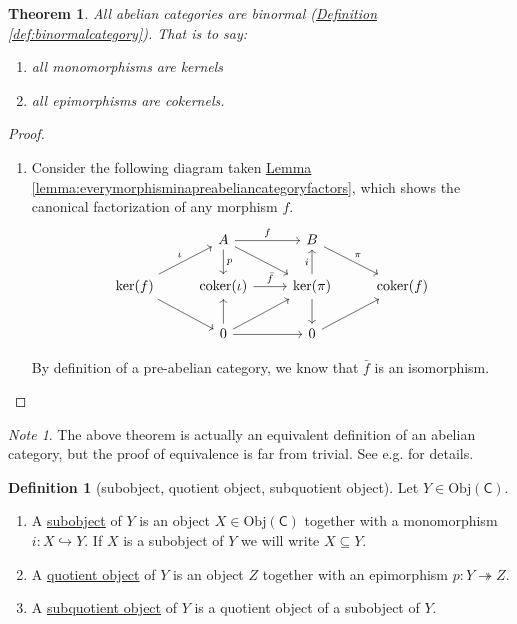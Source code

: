 \documentclass[a4paper,10pt]{scrreprt}
\newcommand{\defn}[1]{\ul{#1}}
\newcommand{\Obj}{\mathrm{Obj}}
\newcommand{\coker}{\mathrm{coker}}
\theoremstyle{definition}
\newtheorem{definition}{Definition}[section]
\theoremstyle{plain}
\newtheorem{theorem}{Theorem}[section]
\theoremstyle{remark}
\newtheorem{note}{Note}[section]
\begin{document}
\begin{theorem}
  All abelian categories are binormal (\hyperref[def:binormalcategory]{Definition \ref*{def:binormalcategory}}). That is to say: 
  \begin{enumerate}
    \item all monomorphisms are kernels
    \item all epimorphisms are cokernels.
  \end{enumerate}
\end{theorem}
\begin{proof}
  $\,$
  \begin{enumerate}
    \item Consider the following diagram taken \hyperref[lemma:everymorphisminapreabeliancategoryfactors]{Lemma \ref*{lemma:everymorphisminapreabeliancategoryfactors}}, which shows the canonical factorization of any morphism $f$.
      \begin{equation*}
        \begin{tikzcd}
          & A
          \arrow[r, "f"]
          \arrow[d, "p"]
          \arrow[dr]
          & B
          \arrow[dr, "\pi"]
          \\
          \ker(f)
          \arrow[ur, "\iota"]
          \arrow[dr]
          & \coker(\iota)
          \arrow[r, "\bar{f}"]
          & \ker(\pi)
          \arrow[u, "i"]
          \arrow[d]
          & \coker(f)
          \\
          & 0
          \arrow[u]
          \arrow[r]
          \arrow[ur]
          & 0
          \arrow[ur]
        \end{tikzcd}
      \end{equation*}

      By definition of a pre-abelian category, we know that $\bar{f}$ is an isomorphism.
  \end{enumerate}
\end{proof}

\begin{note}
  The above theorem is actually an equivalent definition of an abelian category, but the proof of equivalence is far from trivial. See e.g. \cite{freyd-abelian-categories} for details.
\end{note}

\begin{definition}[subobject, quotient object, subquotient object]
  \label{def:subobjectquotientobject}
  Let $Y \in \Obj(\mathsf{C})$.
  \begin{enumerate}
    \item A \defn{subobject} of $Y$ is an object $X \in \Obj(\mathsf{C})$ together with a monomorphism $i\colon X \hookrightarrow Y$. If $X$ is a subobject of $Y$ we will write $X \subseteq Y$.
    \item A \defn{quotient object} of $Y$ is an object $Z$ together with an epimorphism $p\colon Y \twoheadrightarrow Z$.
    \item A \defn{subquotient object} of $Y$ is a quotient object of a subobject of $Y$.
  \end{enumerate}
\end{definition}
\end{document}
